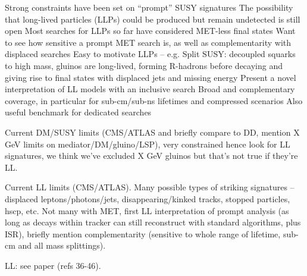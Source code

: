 Strong constraints have been set on “prompt” SUSY signatures
The possibility that long-lived particles (LLPs) could be produced but remain 
undetected is still open
Most searches for LLPs so far have considered MET-less final states
Want to see how sensitive a prompt MET search is, as well as complementarity 
with displaced searches
Easy to motivate LLPs – e.g. Split SUSY: decoupled squarks to high mass, 
gluinos are long-lived, forming R-hadrons before decaying and giving rise to 
final states with displaced jets and missing energy
Present a novel interpretation of LL models with an inclusive search
Broad and complementary coverage, in particular for sub-cm/sub-ns lifetimes and 
compressed scenarios
Also useful benchmark for dedicated searches


Current DM/SUSY limits (CMS/ATLAS and briefly compare to DD, mention X GeV 
limits on 
mediator/DM/gluino/LSP), very constrained hence look for LL signatures, we 
think we’ve excluded X GeV gluinos but that’s not true if they’re LL.

Current LL limits (CMS/ATLAS).
Many possible types of striking signatures -- displaced leptons/photons/jets, 
disappearing/kinked tracks, stopped particles, hscp, etc.
Not many with MET, first LL interpretation of 
prompt analysis (as long as decays within tracker can still reconstruct with 
standard algorithms, plus ISR), briefly mention complementarity (sensitive to 
whole range of lifetime, sub-cm and all mass splittings).


LL: see paper (refs 36-46).

